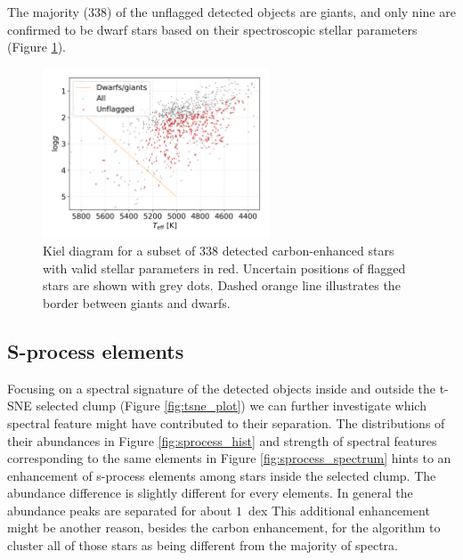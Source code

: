 The majority (338) of the unflagged detected objects are giants, and only nine are confirmed to be dwarf stars based on their spectroscopic stellar parameters (Figure \ref{fig:kiel_plot}).

\begin{figure}
	\centering
	\includegraphics[width=0.6\textwidth]{Kiel_diagram.png}
	\caption{Kiel diagram for a subset of 338 detected carbon-enhanced stars with valid stellar parameters in red. Uncertain positions of flagged stars are shown with grey dots. Dashed orange line illustrates the border between giants and dwarfs.}
	\label{fig:kiel_plot}
\end{figure}

\subsection{S-process elements}
\label{sec:sprocess}
Focusing on a spectral signature of the detected objects inside and outside the t-SNE selected clump (Figure \ref{fig:tsne_plot}) we can further investigate which spectral feature might have contributed to their separation. The distributions of their abundances in Figure \ref{fig:sprocess_hist} and strength of spectral features corresponding to the same elements in Figure \ref{fig:sprocess_spectrum} hints to an enhancement of s-process elements among stars inside the selected clump. The abundance difference is slightly  different for every elements. In general the abundance peaks are separated for about $1$~dex This additional enhancement might be another reason, besides the carbon enhancement, for the algorithm to cluster all of those stars as being different from the majority of spectra.

